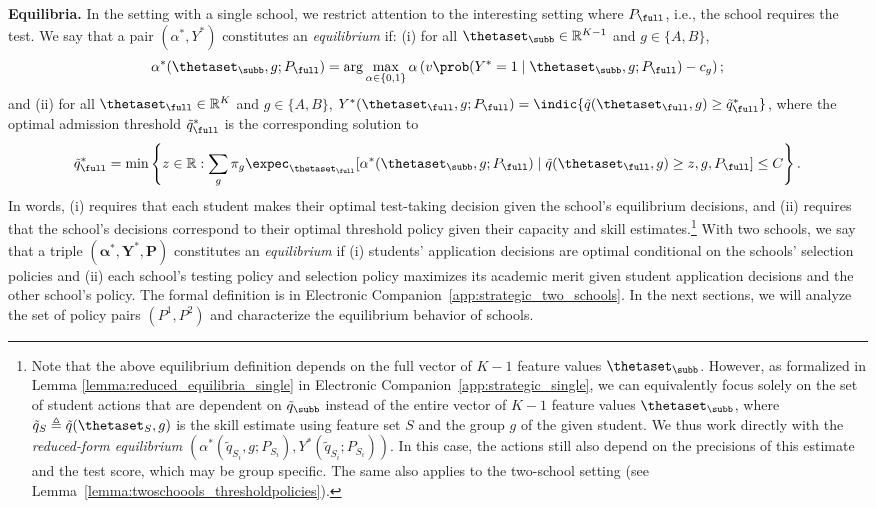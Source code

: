 \smallskip\noindent\textbf{Equilibria.}
In the setting with a single school, we restrict attention to the interesting setting where $P_{\full}$, i.e., the school requires the test. We say that a pair $(\alpha^*, Y^*)$
constitutes an \textit{equilibrium} if: (i) for all  $\thetaset_{\subb} \in \mathbb{R}^{K-1}$ and $g \in \{A,B\}$, $$\alpha^*(\thetaset_{\subb}, g; P_{\full}) = \arg \max_{\alpha \in \{0,1\}} \alpha \left( v \prob (Y^* = 1 \mid \thetaset_{\subb}, g; P_{\full}) - c_g \right);$$ and  (ii) for all  $\thetaset_{\full} \in \mathbb{R}^{K}$ and $g \in \{A,B\}$, $Y^*(\thetaset_{\full}, g; P_{\full}) = \indic\{\tilde q (\thetaset_{\full}, g) \geq \tilde q^*_{\full}\}$, where the optimal admission threshold
$\tilde q^*_{\full}$  is the corresponding solution to
\begin{equation}
    \begin{split}
    \label{eq:singleschoolproblem_main}
    \tilde q^*_{\full} =  \min \left\{z \in \mathbb{R}:
    \sum_g \pi_g \expec_{\thetaset_{\full}}[\alpha^*(\thetaset_{\subb},g; P_{\full})  \mid \tilde q (\thetaset_{\full}, g)  \geq z, g, P_{\full}  ] \leq C\right\}.
\end{split}
\end{equation}
 In words, (i) requires that each student makes their optimal test-taking decision given the school's equilibrium decisions, and (ii) requires that the school's decisions correspond to their optimal threshold policy given their capacity and skill estimates.\footnote{Note that the above equilibrium definition depends on the full vector of $K-1$ feature values $\thetaset_{\subb}$.
However, as formalized in Lemma \ref{lemma:reduced_equilibria_single} in Electronic Companion~\ref{app:strategic_single}, we can equivalently focus solely on the set of student actions that are dependent on $\tilde q_{\subb}$ instead of the entire vector of $K-1$ feature values $\thetaset_{\subb}$, where $\tilde q_{S} \triangleq \tilde q (\thetaset_{S}, g)$  is the skill estimate using feature set $S$ and the group $g$ of the given student.
We thus work directly with the \textit{reduced-form equilibrium} $(\alpha^*(\tilde q_{S_i}, g; P_{S_i}), Y^*(\tilde q_{S_i}; P_{S_i}))$. In this case, the actions still also depend on the precisions of this estimate and the test score, which may be group specific. The same also applies to the two-school setting (see Lemma~\ref{lemma:twoschoools_thresholdpolicies}).}
%
%
With two schools, we say that a triple $(\mathbf{\alpha}^*, \mathbf{Y}^*, \mathbf{P})$ constitutes an \textit{equilibrium} if  (i) students' application decisions are optimal conditional on the schools' selection policies and (ii) each school's testing policy and selection policy maximizes its academic merit given student application decisions and the other school's policy. The formal definition is in Electronic Companion~\ref{app:strategic_two_schools}.
In the next sections, we will analyze the set of policy pairs $(P^1, P^2)$ and characterize the equilibrium behavior of schools.








